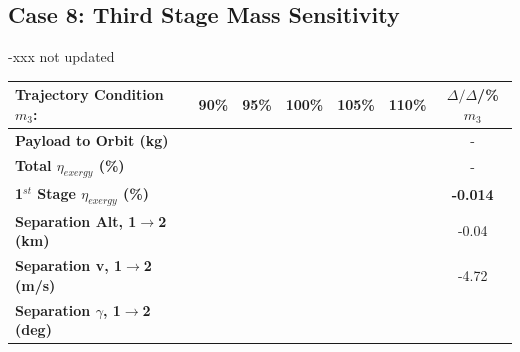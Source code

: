 \subsection{Case 8: Third Stage Mass Sensitivity}\label{sec:m3noReturn}

-xxx not updated

\begin{table}[ht] %
	\centering
	
	\begin{tabular}{l c c c c c c} 
		\hline \textbf{Trajectory Condition}   \qquad  $m_{3}$:
		&90\%
		&95\%
		&100\%
		&105\%
		&110\%
		& $\Delta/\Delta$/\%$m_{3}$
		\\
		\hline \textbf{Payload to Orbit (kg)}
		& \textbf{\PayloadToOrbitmThreeNinetyNoReturn}
		& \textbf{\PayloadToOrbitmThreeNinetyFiveNoReturn}
		& \textbf{\PayloadToOrbitmThreeStandardNoReturn}
		& \textbf{\PayloadToOrbitmThreeOneHundredFiveNoReturn}
		& \textbf{\PayloadToOrbitmThreeOneHundredTenNoReturn}
		& -
		\\
		\textbf{Total $\eta_{exergy}$ (\%)}
		& \textbf{\totalExergyEffmThreeNinetyNoReturn}
		& \textbf{\totalExergyEffmThreeNinetyFiveNoReturn}
		& \textbf{\totalExergyEffmThreeStandardNoReturn}
		& \textbf{\totalExergyEffmThreeOneHundredFiveNoReturn}
		& \textbf{\totalExergyEffmThreeOneHundredTenNoReturn}
		& -
		\\
		\hline 
		\textbf{1$^{st}$ Stage $\eta_{exergy}$ (\%)}
		& \textbf{\firstExergyEffmThreeNinetyNoReturn}
		& \textbf{\firstExergyEffmThreeNinetyFiveNoReturn}
		& \textbf{\firstExergyEffmThreeStandardNoReturn}
		& \textbf{\firstExergyEffmThreeOneHundredFiveNoReturn}
		& \textbf{\firstExergyEffmThreeOneHundredTenNoReturn}
		& \textbf{-0.014}
		\\
		\textbf{Separation Alt, 1$\rightarrow$2 (km)}
		& \firstsecondSeparationAltmThreeNinetyNoReturn
		& \firstsecondSeparationAltmThreeNinetyFiveNoReturn
		& \firstsecondSeparationAltmThreeStandardNoReturn
		& \firstsecondSeparationAltmThreeOneHundredFiveNoReturn
		& \firstsecondSeparationAltmThreeOneHundredTenNoReturn
		&-0.04
		\\
		\textbf{Separation v, 1$\rightarrow$2 (m/s)}
		& \firstsecondSeparationvmThreeNinetyNoReturn
		& \firstsecondSeparationvmThreeNinetyFiveNoReturn
		& \firstsecondSeparationvmThreeStandardNoReturn
		& \firstsecondSeparationvmThreeOneHundredFiveNoReturn
		& \firstsecondSeparationvmThreeOneHundredTenNoReturn
		&-4.72
		\\
		\textbf{Separation $\gamma$, 1$\rightarrow$2 (deg)}
		& \firstsecondSeparationgammamThreeNinetyNoReturn

\end{tabular}
\end{table}

